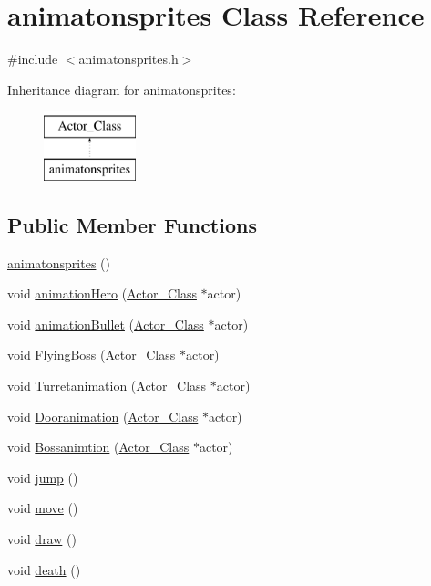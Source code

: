 \hypertarget{classanimatonsprites}{}\section{animatonsprites Class Reference}
\label{classanimatonsprites}


{\ttfamily \#include $<$animatonsprites.\+h$>$}

Inheritance diagram for animatonsprites\+:\begin{figure}[H]
\begin{center}
\leavevmode
\includegraphics[height=2.000000cm]{classanimatonsprites}
\end{center}
\end{figure}
\subsection*{Public Member Functions}
\begin{DoxyCompactItemize}
\item 
\hyperlink{classanimatonsprites_a68866689ab26f4a7fff5d3d44a8c46b9}{animatonsprites} ()
\item 
void \hyperlink{classanimatonsprites_a8f2c1a1d40776af39e45c125367fbc54}{animation\+Hero} (\hyperlink{class_actor___class}{Actor\+\_\+\+Class} $\ast$actor)
\item 
void \hyperlink{classanimatonsprites_aeef3560c6b0faaeb00af4a2b88a9ce5d}{animation\+Bullet} (\hyperlink{class_actor___class}{Actor\+\_\+\+Class} $\ast$actor)
\item 
void \hyperlink{classanimatonsprites_abd2ff02cecde1c8fa445c9c61dadb7b2}{Flying\+Boss} (\hyperlink{class_actor___class}{Actor\+\_\+\+Class} $\ast$actor)
\item 
void \hyperlink{classanimatonsprites_a82db8f9361e43e23f8044b35739dbb4f}{Turretanimation} (\hyperlink{class_actor___class}{Actor\+\_\+\+Class} $\ast$actor)
\item 
void \hyperlink{classanimatonsprites_a94dceae0ec3b4efe4940c4e8208ce1e6}{Dooranimation} (\hyperlink{class_actor___class}{Actor\+\_\+\+Class} $\ast$actor)
\item 
void \hyperlink{classanimatonsprites_a48b0fe9fa65a843657f026a1f56eedd8}{Bossanimtion} (\hyperlink{class_actor___class}{Actor\+\_\+\+Class} $\ast$actor)
\item 
void \hyperlink{classanimatonsprites_a45b6be4805c6e25497956b88c176f552}{jump} ()
\item 
void \hyperlink{classanimatonsprites_a1cf7f2fb8b5a3299b05052c8b6328f01}{move} ()
\item 
void \hyperlink{classanimatonsprites_ac009e9d25649abc90551981421de9f72}{draw} ()
\item 
void \hyperlink{classanimatonsprites_a50c1ab6bdeb5462156197f1208d8bde5}{death} ()
\end{DoxyCompactItemize}



